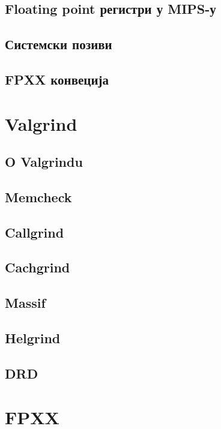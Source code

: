 \documentclass[12pt,oneside]{memoir}
\begin{document}
\section{Floating point регистри у MIPS-у}

\section{Системски позиви}

\section{FPXX конвеција}

\chapter{Valgrind}
\label{chp:valgrind}

\section{O Valgrindu}

\section{Memcheck}

\section{Callgrind}

\section{Cachgrind}

\section{Massif}

\section{Helgrind}

\section{DRD}

\chapter{FPXX}
\label{chp:fpxx}
\end{document}
